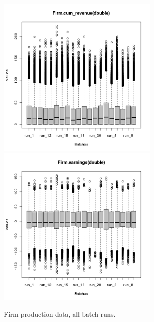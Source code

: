 \begin{figure}[H!]
\centering\leavevmode
\begin{minipage}{17cm}
\centering\leavevmode
\includegraphics[width=8cm]{./png/tax_0.05/Firm-cum_revenue-batches.png}
\includegraphics[width=8cm]{./png/tax_0.05/Firm-earnings-batches.png}
\end{minipage}
\caption{Firm production data, all batch runs.}
\label{Figure: Firm Production batch}
\end{figure}
\clearpage


